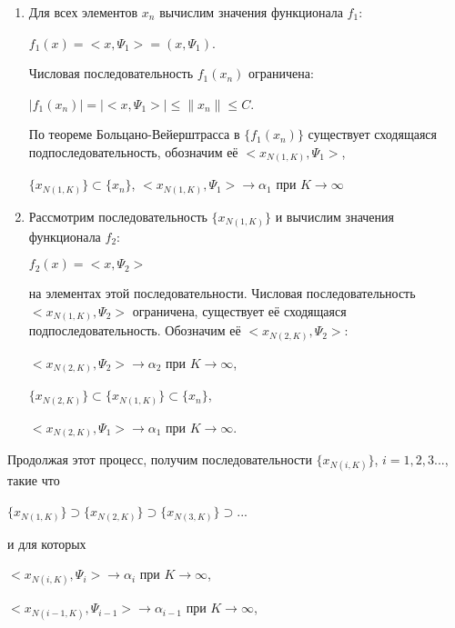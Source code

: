 \documentclass[12pt,a4paper,titlepage, oneside]{book}
\theoremstyle{definition}
\theoremstyle{plain}
\theoremstyle{remark}
\theoremstyle{remark}
\theoremstyle{remark}
\theoremstyle{remark}
\theoremstyle{plain}
\theoremstyle{plain}
\begin{document}
\begin{enumerate}
\item Для всех элементов $x_n$ вычислим значения функционала $f_1$:

\begin{center}
$f_1(x)=<x,\Psi_1>=(x,\Psi_1)$.
\end{center}
Числовая последовательность $f_1(x_n)$ ограничена:
\begin{center}
$\vert f_1(x_n)\vert = \vert<x,\Psi_1>\vert \leq \parallel x_n\parallel \leq C$.
\end{center}
По теореме Больцано-Вейерштрасса в $\lbrace f_1(x_n) \rbrace$ существует сходящаяся подпоследовательность, обозначим её 
$<x_{N(1,K)},\Psi_1>$,
\begin{center}
$\lbrace x_{N(1,K)} \rbrace \subset
 \lbrace x_n \rbrace$, $<x_{N(1,K)},\Psi_1> \to \alpha_1$ при $K\to\infty$
\end{center}

\item Рассмотрим последовательность $\lbrace x_{N(1,K)} \rbrace$ и вычислим значения функционала $f_2$:
\begin{center}
$f_2(x)=<x,\Psi_2>$ 
\end{center}
на элементах этой последовательности. Числовая последовательность $ < x_{N(1,K)},\Psi_2>$ ограничена, существует её сходящаяся подпоследовательность. Обозначим её 
$<x_{N(2,K)},\Psi_2>$:
\begin{center}
$<x_{N(2,K)},\Psi_2> \to \alpha_2$ при
 $K\to\infty$, 
 \end{center}
 \begin{center}
$\lbrace x_{N(2,K)} \rbrace \subset 
\lbrace x_{N(1,K)} \rbrace \subset 
 \lbrace x_n \rbrace$,
  \end{center}
 \begin{center}
 $<x_{N(2,K)},\Psi_1> \to \alpha_1$ при
 $K\to\infty$. 
\end{center}
\end{enumerate}
Продолжая этот процесс, получим последовательности 
$\lbrace x_{N(i,K)} \rbrace$, $i=1,2,3...$, такие что 
 \begin{center}
 $\lbrace x_{N(1,K)} \rbrace \supset
\lbrace x_{N(2,K)} \rbrace \supset
\lbrace x_{N(3,K)} \rbrace \supset$...
\end{center}
и для которых
 \begin{center}
 $<x_{N(i,K)},\Psi_i> \to \alpha_i$ при
 $K\to\infty$, 
 \end{center}
 \begin{center}
 $<x_{N(i-1,K)},\Psi_{i-1}> \to \alpha_{i-1}$ при
 $K\to\infty$, 
 \end{center}
\end{document}
